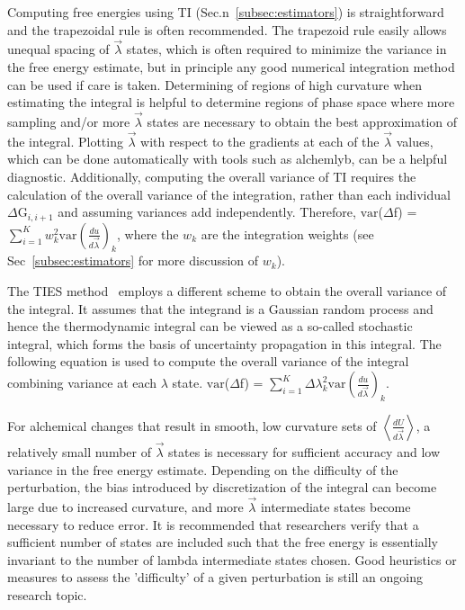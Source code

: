 \documentclass[9pt,bestpractices]{livecoms}
\newcommand{\expect}[1]{\left\langle{#1}\right\rangle}
\begin{document}
Computing free energies using TI (Sec.n~\ref{subsec:estimators}) is straightforward and the trapezoidal rule is often recommended. The trapezoid rule easily allows unequal spacing of $\vec{\lambda}$ states, which is often required to minimize the variance in the free energy estimate, but in principle any good numerical integration method can be used if care is taken.  
Determining of regions of high curvature when estimating the integral is helpful to determine regions of phase space where more sampling and/or more $\vec{\lambda}$ states are necessary to obtain the best approximation of the integral. Plotting $\vec{\lambda}$ with respect to the gradients at each of the $\vec{\lambda}$ values, which can be done automatically with tools such as alchemlyb,  can be a helpful diagnostic. 
Additionally, computing the overall variance of TI requires the calculation of the overall variance of the integration, rather than each individual $\Delta$G$_{i,i+1}$ and assuming variances add independently. 
Therefore, $\mathrm{var}$($\Delta$f) = $\sum_{i=1}^{K}w_{k}^2 \mathrm{var}(\frac{du}{d\vec{\lambda}})_{k}$, where the $w_k$ are the integration weights (see Sec~\ref{subsec:estimators} for more discussion of $w_k$).

The TIES method~\cite{bhati2017} employs a different scheme to obtain the overall variance of the integral. It assumes that the integrand is a Gaussian random process and hence the thermodynamic integral can be viewed as a so-called stochastic integral, which forms the basis of uncertainty propagation in this integral. The following equation is used to compute the overall variance of the integral combining variance at each $\lambda$ state. $\mathrm{var}$($\Delta$f) = $\sum_{i=1}^{K}\Delta\lambda_{k}^2 \mathrm{var}(\frac{du}{d\vec{\lambda}})_{k}$. 

For alchemical changes that result in smooth, low curvature sets of $\expect{\frac{dU}{d\vec{\lambda}}}$, a relatively small number of $\vec{\lambda}$ states is necessary for sufficient accuracy and low variance in the free energy estimate. 
Depending on the difficulty of the perturbation, the bias introduced by discretization of the integral can become large due to increased curvature, and more $\vec{\lambda}$ intermediate states become necessary to reduce error.
It is recommended that researchers verify that a sufficient number of states are included such that the free energy is essentially invariant to the number of lambda intermediate states chosen. Good heuristics or measures to assess the 'difficulty' of a given perturbation is still an ongoing research topic. 
\end{document}
